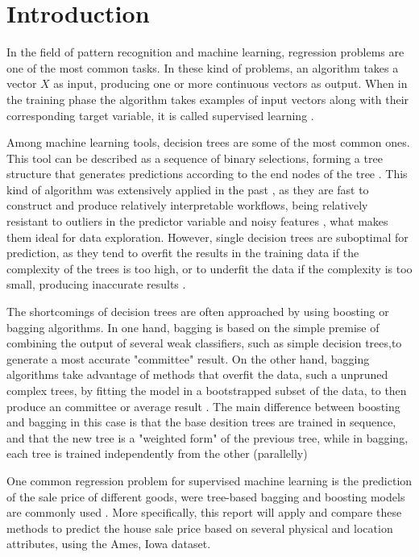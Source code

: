 \documentclass[11pt,onecolumn,titlepage,letterpaper]{article}
\begin{document}
\section{Introduction}

In the field of pattern recognition and machine learning, regression problems are one of the most common tasks. In these kind of problems, an algorithm takes a vector $X$ as input, producing one or more continuous vectors as output. When in the training phase the algorithm takes examples of input vectors along with their corresponding target variable, it is called supervised learning \cite{Bishop2006}. 

Among machine learning tools, decision trees are some of the most common ones. This tool can be described as a sequence of binary selections, forming a tree structure \cite{Bishop2006} that generates predictions according to the end nodes of the tree \cite{Hastie2009}. This kind of algorithm was extensively applied in the past \cite{Quinlan1986, Vapnik1995}, as they are fast to construct and produce relatively interpretable workflows, being relatively resistant to outliers in the predictor variable \cite{Hastie2009} and noisy features \cite{Quinlan1986}, what makes them ideal for data exploration. However, single decision trees are suboptimal for prediction, as they tend to overfit the results in the training data if the complexity of the trees is too high, or to underfit the data if the complexity is too small, producing inaccurate results \cite{Hastie2009}. 

The shortcomings of decision trees are often approached by using boosting or bagging algorithms. In one hand, bagging is based on the simple premise of combining the output of several weak classifiers, such as simple decision trees,to generate a most accurate "committee" result. On the other hand, bagging algorithms take advantage of methods that overfit the data, such a unpruned complex trees, by fitting the model in a bootstrapped subset of the data, to then produce an committee or average result \cite{Hastie2009}. The main difference between boosting and bagging in this case is that the base desition trees are trained in sequence, and that the new tree is a "weighted form" of the previous tree, while in bagging, each tree is trained independently from the other (parallelly) \cite{Bishop2006}

One common regression problem for supervised machine learning is the prediction of the sale price of different goods, were tree-based bagging and boosting models are commonly used \cite{Ceh2018}. More specifically, this report will apply and compare these methods to predict the house sale price based on several physical and location attributes, using the Ames, Iowa dataset.
\end{document}
